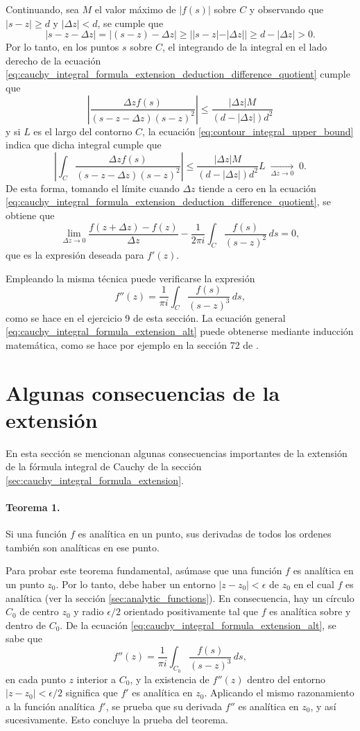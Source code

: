 \documentclass[a4paper]{report}
\begin{document}
Continuando, sea \(M\) el valor máximo de \(|f(s)|\) sobre \(C\) y observando que \(|s-z|\geq d\) y \(|\Delta z|<d\), se cumple que 
\[
 |s-z-\Delta z|=|(s-z)-\Delta z|\geq||s-z|-|\Delta z||\geq d-|\Delta z|>0.
\]
Por lo tanto, en los puntos \(s\) sobre \(C\), el integrando de la integral en el lado derecho de la ecuación \ref{eq:cauchy_integral_formula_extension_deduction_difference_quotient} cumple que 
\[
 \left|\frac{\Delta zf(s)}{(s-z-\Delta z)(s-z)^2}\right|\leq\frac{|\Delta z|M}{(d-|\Delta z|)d^2}
\]
y si \(L\) es el largo del contorno \(C\), la ecuación \ref{eq:contour_integral_upper_bound} indica que dicha integral cumple que 
\[
 \left|\int_C\frac{\Delta zf(s)}{(s-z-\Delta z)(s-z)^2}\right|\leq\frac{|\Delta z|M}{(d-|\Delta z|)d^2}L\;\xrightarrow[\Delta z\to0]{}\;0.
\]
De esta forma, tomando el límite cuando \(\Delta z\) tiende a cero en la ecuación \ref{eq:cauchy_integral_formula_extension_deduction_difference_quotient}, se obtiene que 
\[
 \lim_{\Delta z\to0}\frac{f(z+\Delta z)-f(z)}{\Delta z}-\frac{1}{2\pi i}\int_C\frac{f(s)}{(s-z)^2}\,ds=0,
\]
que es la expresión deseada para \(f'(z)\).

Empleando la misma técnica puede verificarse la expresión
\[
 f''(z)=\frac{1}{\pi i}\int_{C}\frac{f(s)}{(s-z)^3}\,ds,
\]
como se hace en el ejercicio 9 de esta sección. La ecuación general \ref{eq:cauchy_integral_formula_extension_alt} puede obtenerse mediante inducción matemática, como se hace por ejemplo en la sección 72 de \cite{markushevich1965theory}.

\section{Algunas consecuencias de la extensión}\label{sec:cauchy_integral_formula_extension_consecuences}

En esta sección se mencionan algunas consecuencias importantes de la extensión de la fórmula integral de Cauchy de la sección \ref{sec:cauchy_integral_formula_extension}.

\paragraph{Teorema 1.} Si una función \(f\) es analítica en un punto, sus derivadas de todos los ordenes también son analíticas en ese punto.

Para probar este teorema fundamental, asúmase que una función \(f\) es analítica en un punto \(z_0\). Por lo tanto, debe haber un entorno \(|z-z_0|<\epsilon\) de \(z_0\) en el cual \(f\) es analítica (ver la sección \ref{sec:analytic_functions}). En consecuencia, hay un círculo \(C_0\) de centro \(z_0\) y radio \(\epsilon/2\) orientado positivamente tal que \(f\) es analítica sobre y dentro de \(C_0\). De la ecuación \ref{eq:cauchy_integral_formula_extension_alt}, se sabe que 
\[
 f''(z)=\frac{1}{\pi i}\int_{C_0}\frac{f(s)}{(s-z)^3}\,ds,
\]
en cada punto \(z\) interior a \(C_0\), y la existencia de \(f''(z)\) dentro del entorno \(|z-z_0|<\epsilon/2\) significa que \(f'\) es analítica en \(z_0\). Aplicando el mismo razonamiento a la función analítica \(f'\), se prueba que su derivada \(f''\) es analítica en \(z_0\), y así sucesivamente. Esto concluye la prueba del teorema.
\end{document}
